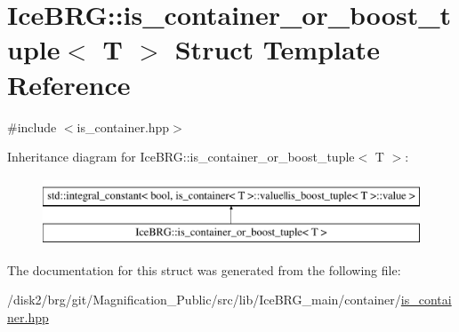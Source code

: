 \hypertarget{structIceBRG_1_1is__container__or__boost__tuple}{}\section{Ice\+B\+R\+G\+:\+:is\+\_\+container\+\_\+or\+\_\+boost\+\_\+tuple$<$ T $>$ Struct Template Reference}
\label{structIceBRG_1_1is__container__or__boost__tuple}


{\ttfamily \#include $<$is\+\_\+container.\+hpp$>$}

Inheritance diagram for Ice\+B\+R\+G\+:\+:is\+\_\+container\+\_\+or\+\_\+boost\+\_\+tuple$<$ T $>$\+:\begin{figure}[H]
\begin{center}
\leavevmode
\includegraphics[height=2.000000cm]{structIceBRG_1_1is__container__or__boost__tuple}
\end{center}
\end{figure}


The documentation for this struct was generated from the following file\+:\begin{DoxyCompactItemize}
\item 
/disk2/brg/git/\+Magnification\+\_\+\+Public/src/lib/\+Ice\+B\+R\+G\+\_\+main/container/\hyperlink{is__container_8hpp}{is\+\_\+container.\+hpp}\end{DoxyCompactItemize}
